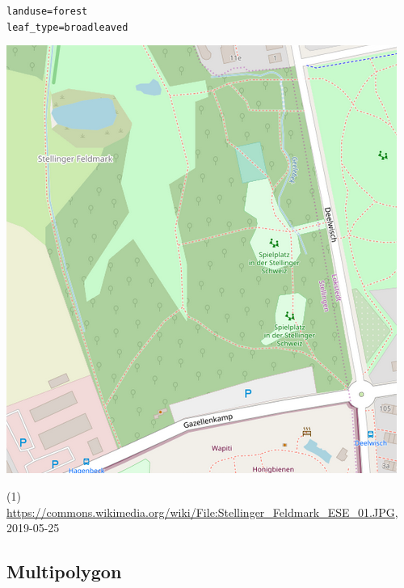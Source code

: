\documentclass{beamer}
\begin{document}
\begin{frame}
\begin{center}
			\begin{minipage}[b][0.6\textheight][c]{0.3\linewidth}
				\texttt{landuse=forest}\\
				\texttt{leaf\_type=broadleaved}
				\begin{center}
					\includegraphics[width=\linewidth,height=\textheight,keepaspectratio]{images/forest.png}
				\end{center}
			\end{minipage}
		\end{center}
		{\tiny (1) \url{https://commons.wikimedia.org/wiki/File:Stellinger_Feldmark_ESE_01.JPG}, 2019-05-25}
	\end{frame}
				
	\subsection{Multipolygon}
	
\end{document}
